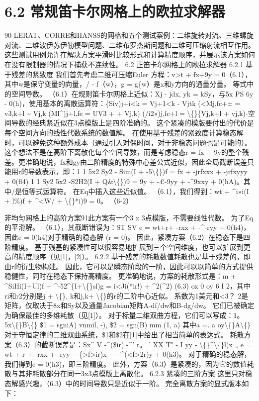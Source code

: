 \documentclass[UTF8,11pt,a4paper,openany,fontset=fandol]{ctexbook}
\begin{document}
\section{6.2 常规笛卡尔网格上的欧拉求解器}
90 LERAT、CORRE和HANSS的网格和五个测试案例：二维旋转对流、三维螺旋对流、二维波伊苏伊勒模型问题、二维布罗杰斯问题和二维可压缩射流相互作用。 这些测试用例允许在解决方案平滑时比较形式和计算精度顺序，并展示该方案如何在没有限制器的情况下捕获不连续性。 6.2 正笛卡尔网格上的欧拉求解器 6.2.1 基于残差的紧致度 我们首先考虑二维可压缩Euler 方程：v>t + fx+9y = 0（6.1），其中w是保守变量的向量，/ - f（w），g = g\{w）是x和y方向的通量分量。 等式中的空间导数。 （6.1）在规则笛卡尔网格上近似：Xj - jdx, yk = kSy，与5x PS 6y - 0(h)，使用基本的离散运算符：\{Siv)j+i<k = Vj+1<k - Vjtk (<Mj,fc+± = v3,k+l \textasciitilde{} Vj,k (Ml\textasciicircum{})j+l,fe = UV3 + + Vj,k) (/i2«)j,fc+l = \textbackslash\{\}\{Vj,k+l + vj,k)-空间导数的经典紧近似在3点模版上是四阶准确的。 这个紧凑的模版要付出的代价是每个空间方向的线性代数系统的数值解。 在使用基于残差的紧致度计算稳态解时，可以避免这种额外成本（通过引入对偶时间，对于非稳态问题也是可能的）。 这个想法不是在高阶下离散化每个空间导数，而是考虑稳态r = fx + 9y的整个残差。更准确地说，fx和gy由二阶精度的特殊中心差公式近似，因此全局截断误差只能用r的导数表示，即：1 1 5x2 Sy2 - Sim(I + -5\textbackslash\{\})f = fx + -jrfxxx + -jrfxyyy + 0(fl4) 1 1 Sy2 5x2 -S2H2(I + Q\&\textbackslash\{\})9 = 9y + -£-9yy + -\textasciicircum{}9xxy + 0(hA)。其中/是恒等式运算符。 在Eq中插入这些近似值。 （6.1），我们得到：wt + \textasciicircum{}i»i(I + l\%)f + \textasciicircum{}<W/ + \textbackslash\{\}*i)9 = 0。 （6-2）

非均匀网格上的高阶方案91此方案有一个3 x 3点模版，不需要线性代数。 为了Eq的平滑解。 （6.1），其截断错误为：ST SV e = wt+r+ -rxx + -\textasciicircum{}-ryy + 0(h4)，因此e = 0(h4)对于精确的稳态解 (r = 0)。 因此，紧凑方案（6.2）在稳态下是四阶精度。 基于残基的紧凑性可以很容易地扩展到三个空间维度，也可以扩展到更高的精度顺序（见[1]，[2]）。 6.2.2 基于残差的耗散数值耗散也是基于残差的，即由r的衍生物构建。 因此，它可以是瞬态阶段的一阶，因此可以以简单的方式提供稳健性，同时在稳态下保持高精度。 更准确地说，方案的耗散形式是：m + \textasciicircum{}SiHi(I+Ul)f + \textasciicircum{}-52\textasciicircum{}\{I+\textbackslash\{\}sl)g = i<Ji(*ir!) + \textasciicircum{}2(\textasciicircum{}2) (6.3) ox 0 oy 6 I 2，其中ri和r2分别是j + \textbackslash\{\}, k和j,k+ \textbackslash\{\}的r的二阶中心近似。 系数为1美元和<3？ 2是矩阵，仅取决于8x和Sy以及通量Jacobian矩阵A-df/dw和B-dg/dw。 它们已被确定为确保最佳的多维耗散（见[1]）。 对于标量二维双曲方程，它们可以写成：1。 5x\textbackslash\{\}B\textbackslash\{\} \$1 = sgniA) vnmil, -), \$2 = sgn(B) mm (1, a) 其中a =. a oy\textbackslash\{\}A\textbackslash\{\} 对于守恒定律的二维双曲系统，\$1和\$2在[1]中给出了相当简单的表达式。 耗散方案（6.3）的截断误差是：Sx\textasciicircum{} V -\textasciicircum{}(\$ir) -\textasciicircum{}' r。 ' XX T" - I yy - \textbackslash\{\}\textasciicircum{}\textbackslash\{\}l)x „ e = wt + r + -rxx + -ryy - -\{>f>ir)x - - -\textasciicircum{}(<f>2r)y + 0(h3)。 对于精确的稳态解，我们得到e = 0(h3)，即三阶精度。 此外，方案（6.3）是紧凑的，因为它的数值耗散与其非耗散部分在同一3x3点模版上离散化。 6.2.3 紧凑的三阶方案 这里只对稳态解感兴趣，（6.3）中的时间导数只是近似于一阶。 完全离散方案的显式版本如下：
\end{document}
